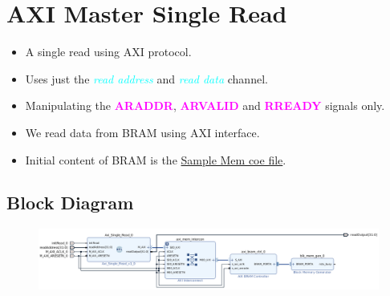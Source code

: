 \documentclass{article}
\newcommand{\chFormat}[1]{\emph{\textcolor{cyan}{#1}}}
\newcommand{\AXISignals}[1]{\textbf{\textcolor{magenta}{#1}}}
\begin{document}
\section{AXI Master Single Read}
\begin{itemize}
    \item A single read using AXI protocol.
    \item Uses just the \chFormat{read address} and \chFormat{read data} channel.
    \item Manipulating the \AXISignals{ARADDR}, \AXISignals{ARVALID} and \AXISignals{RREADY} signals only.
    \item We read data from BRAM using AXI interface.
    \item Initial content of BRAM is the \href{./MemFiles/SampleMemFile.coe}{Sample Mem coe file}.
\end{itemize}
\subsection{Block Diagram}
\begin{figure}[H]
    \centering
    \includegraphics[width=1\textwidth]{Resources/SingleReadBRAM.png}
\end{figure}
\end{document}
